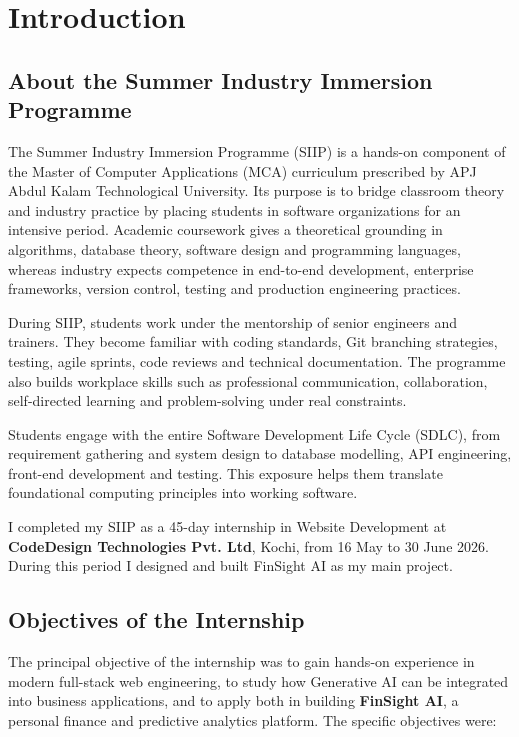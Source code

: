 \documentclass[12pt,a4paper]{report}
\begin{document}
\endgroup

\newpage
{}
\pagestyle{maincontent}

\chapter{Introduction}\label{ch1}

\section{About the Summer Industry Immersion Programme}\label{s11}

The Summer Industry Immersion Programme (SIIP) is a hands-on component of the Master of Computer Applications (MCA) curriculum prescribed by APJ Abdul Kalam Technological University. Its purpose is to bridge classroom theory and industry practice by placing students in software organizations for an intensive period. Academic coursework gives a theoretical grounding in algorithms, database theory, software design and programming languages, whereas industry expects competence in end-to-end development, enterprise frameworks, version control, testing and production engineering practices.

During SIIP, students work under the mentorship of senior engineers and trainers. They become familiar with coding standards, Git branching strategies, testing, agile sprints, code reviews and technical documentation. The programme also builds workplace skills such as professional communication, collaboration, self-directed learning and problem-solving under real constraints.

Students engage with the entire Software Development Life Cycle (SDLC), from requirement gathering and system design to database modelling, API engineering, front-end development and testing. This exposure helps them translate foundational computing principles into working software.

I completed my SIIP as a 45-day internship in Website Development at \textbf{CodeDesign Technologies Pvt. Ltd}, Kochi, from 16 May to 30 June 2026. During this period I designed and built FinSight AI as my main project.


\section{Objectives of the Internship}\label{s12}

The principal objective of the internship was to gain hands-on experience in modern full-stack web engineering, to study how Generative AI can be integrated into business applications, and to apply both in building \textbf{FinSight AI}, a personal finance and predictive analytics platform. The specific objectives were:
\end{document}
